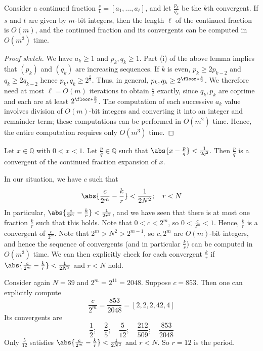 \begin{theorem}
    Consider a continued fraction $\frac{s}{t} = [a_1, \dots, a_\ell]$, and let $\frac{p_k}{q_k}$ be the $k$th convergent.
    If $s$ and $t$ are given by $m$-bit integers, then the length $\ell$ of the continued fraction is $O(m)$, and the continued fraction and its convergents can be computed in $O(m^3)$ time.
\end{theorem}
\begin{proof}[Proof sketch]
    We have $a_k \geq 1$ and $p_k, q_k \geq 1$.
    Part (i) of the above lemma implies that $(p_k)$ and $(q_k)$ are increasing sequences.
    If $k$ is even, $p_k \geq 2p_{k-2}$ and $q_k \geq 2q_{k-2}$ hence $p_k, q_k \geq 2^{\frac{k}{2}}$.
    Thus, in general, $p_k, q_k \geq 2^{\floor*{\frac{k}{2}}}$.
    We therefore need at most $\ell = O(m)$ iterations to obtain $\frac{s}{t}$ exactly, since $q_k, p_k$ are coprime and each are at least $2^{\floor*{\frac{k}{2}}}$.
    The computation of each successive $a_k$ value involves division of $O(m)$-bit integers and converting it into an integer and remainder term; these computations can be performed in $O(m^2)$ time.
    Hence, the entire computation requires only $O(m^3)$ time.
\end{proof}
\begin{theorem}
    Let $x \in \mathbb Q$ with $0 < x < 1$.
    Let $\frac{p}{q} \in \mathbb Q$ such that $\abs{x - \frac{p}{q}} < \frac{1}{2q^2}$.
    Then $\frac{p}{q}$ is a convergent of the continued fraction expansion of $x$.
\end{theorem}
In our situation, we have $c$ such that
\[ \abs{\frac{c}{2^m} - \frac{k}{r}} < \frac{1}{2N^2};\quad r < N \]
In particular, $\abs{\frac{c}{2^m} - \frac{k}{r}} < \frac{1}{2r^2}$, and we have seen that there is at most one fraction $\frac{k}{r}$ such that this holds.
Note that $0 < c < 2^m$, so $0 < \frac{c}{2^m} < 1$.
Hence, $\frac{k}{r}$ is a convergent of $\frac{c}{2^m}$.
Note that $2^m > N^2 > 2^{m-1}$, so $c, 2^m$ are $O(m)$-bit integers, and hence the sequence of convergents (and in particular $\frac{k}{r}$) can be computed in $O(m^3)$ time.
We can then explicitly check for each convergent $\frac{k}{r}$ if $\abs{\frac{c}{2^m} - \frac{k}{r}} < \frac{1}{2N^2}$ and $r < N$ hold.
\begin{example}
    Consider again $N = 39$ and $2^m = 2^{11} = 2048$.
    Suppose $c = 853$.
    Then one can explicitly compute
    \[ \frac{c}{2^m} = \frac{853}{2048} = [2, 2, 2, 42, 4] \]
    Its convergents are
    \[ \frac{1}{2};\quad \frac{2}{5};\quad \frac{5}{12};\quad \frac{212}{509};\quad \frac{853}{2048} \]
    Only $\frac{5}{12}$ satisfies $\abs{\frac{c}{2^m} - \frac{k}{r}} < \frac{1}{2N^2}$ and $r < N$.
    So $r = 12$ is the period.
\end{example}
